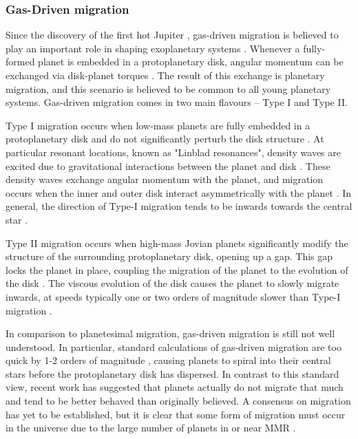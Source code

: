 \subsubsection{Gas-Driven migration}
Since the discovery of the first hot Jupiter \citep{Mayor1995}, gas-driven migration is believed to play an important role in shaping exoplanetary systems \citep{Lin1996}.
Whenever a fully-formed planet is embedded in a protoplanetary disk, angular momentum can be exchanged via disk-planet torques \citep{Goldreich1980}.
The result of this exchange is planetary migration, and this scenario is believed to be common to all young planetary systems. 
Gas-driven migration comes in two main flavours -- Type I and Type II. 

Type I migration occurs when low-mass planets are fully embedded in a protoplanetary disk and do not significantly perturb the disk structure \citep{Armitage2010}. 
At particular resonant locations, known as "Linblad resonances", density waves are excited due to gravitational interactions between the planet and disk \citep{Goldreich1979}. 
These density waves exchange angular momentum with the planet, and migration occurs when the inner and outer disk interact asymmetrically with the planet \citep{Goldreich1979}.
In general, the direction of Type-I migration tends to be inwards towards the central star \citep{Ward1997}.

Type II migration occurs when high-mass Jovian planets significantly modify the structure of the surrounding protoplanetary disk, opening up a gap. 
This gap locks the planet in place, coupling the migration of the planet to the evolution of the disk \citep{Lin1986}.
The viscous evolution of the disk causes the planet to slowly migrate inwards, at speeds typically one or two orders of magnitude slower than Type-I migration \citep{Ward1997}.

In comparison to planetesimal migration, gas-driven migration is still not well understood. 
In particular, standard calculations of gas-driven migration are too quick by 1-2 orders of magnitude \citep{Lin1986, Tanaka2002}, causing planets to spiral into their central stars before the protoplanetary disk has dispersed.
In contrast to this standard view, recent work \citep{Fung2017} has suggested that planets actually do not migrate that much and tend to be better behaved than originally believed. 
A consensus on migration has yet to be established, but it is clear that some form of migration must occur in the universe due to the large number of planets in or near MMR \citep{Lissauer2011,Fabrycky2014,Steffen2015}.

